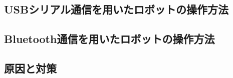 \documentclass[dvipdfmx]{jsarticle}
\begin{document}
\subsection{USBシリアル通信を用いたロボットの操作方法}
\subsection{Bluetooth通信を用いたロボットの操作方法}
\subsection{原因と対策}
\end{document}
